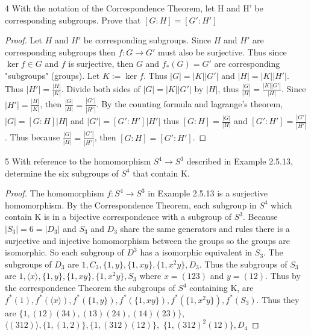 \documentclass{article}
\newcommand{\abs}[1]{\lvert #1\rvert}
\newcommand{\angles}[1]{\langle{#1}\rangle}
\begin{document}
\bigskip

\begin{PROB}{4}\label{Problem 4.}
    With the notation of the Correspondence Theorem, let H and H' be corresponding subgroups. Prove that $[G : H] = [G': H']$
\end{PROB}
\begin{proof}
    Let $H$ and $H'$ be corresponding subgroups. Since $H$ and $H'$ are corresponding subgroups then $f: G \to G'$ must also be surjective. Thus since $\ker f \in G$ and $f$ is surjective, then $G$ and $f_*(G) = G'$ are corresponding "subgroups" (groups). Let $K := \ker f$. Thus $\abs{G} = \abs{K}\abs{G'}$ and $\abs{H} = \abs{K}\abs{H'}$. Thus $\abs{H'} = \frac{\abs{H}}{\abs{K}}$. Divide both sides of $\abs{G} = \abs{K}\abs{G'}$ by $\abs{H}$, thus $\frac{|G|}{|H|} = \frac{|K||G'|}{|H|}$. Since $\abs{H'} = \frac{\abs{H}}{\abs{K}}$, then $\frac{|G|}{|H|} = \frac{|G'|}{|H'|}$. By the counting formula and lagrange's theorem, $|G| = [G : H]|H|$ and $|G'| = [G' : H']|H'|$ thus $[G : H] = \frac{|G|}{|H|}$ and $[G' : H'] = \frac{|G'|}{|H'|}$. Thus because $\frac{|G|}{|H|} = \frac{|G'|}{|H'|}$, then $[G: H] = [G':H']$.
\end{proof}

\bigskip

\begin{PROB}{5}\label{Problem 5.}
    With reference to the homomorphism $S^4 \to S^3$ described in Example 2.5.13, determine the six subgroups of $S^4$ that contain K.
\end{PROB}
\begin{proof}
    The homomorphism $f : S^4 \to S^3$ in Example 2.5.13 is a surjective homomorphism. By the Correspondence Theorem, each subgroup in $S^4$ which contain K is in a bijective correspondence with a subgroup of $S^3$. Because $\abs{S_3} = 6 = \abs{D_3}$ and $S_3$ and $D_3$ share the same generators and rules there is a surjective and injective homomorphism between the groups so the groups are isomorphic. So each subgroup of $D^3$ has a isomorphic equivalent in $S_3$. The subgroups of $D_3$ are $1, C_3, \{1, y\}, \{1, xy\}, \{1, x^2y\}, D_3$. Thus the subgroups of $S_3$ are $1, \angles{x}, \{1, y\}, \{1, xy\}, \{1, x^2y\}, S_3$ where $x = (1 2 3)$ and $y = (1 2)$. Thus by the correspondence Theorem the subgroups of $S^4$ containing K, are $f^*(1), f^*(\angles{x}), f^*(\{1, y\}), f^*(\{1, xy\}), f^*(\{1, x^2y\}), f^*(S_3)$. Thus they are $\{1, (12)(34), (13)(24), (14)(23)\}$, $\angles{(312)}, \{1, (1, 2)\}, \{1, (312)(12)\},$ $\{1, (312)^2(12)\}, D_4$
\end{proof}
\end{document}

